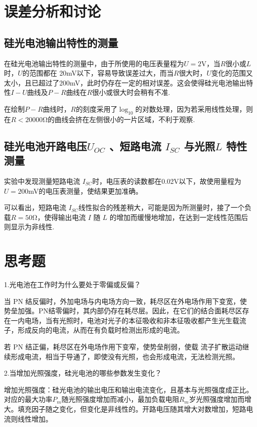 \documentclass[11pt]{article}
\begin{document}
\section{误差分析和讨论}
\subsection{硅光电池输出特性的测量}
在硅光电池输出特性的测量中，由于所使用的电压表量程为$ U=2 $V，当$ R $很小或$ L $时，$ U $的范围都在
20mV以下，容易导致误差过大，而当$ R $很大时，$ U $变化的范围又太小，且已超过了200mV，此时仍存在一定的相对误差。这会使得硅光电池输出特性$ I-U $曲线及$ P-R $曲线在$ R $很小或很大时会稍有不准.

在绘制$ P-R $曲线时，$ R $的刻度采用了$ \log_{10} $的对数处理，因为若采用线性处理，则在$ R<20000 $Ω的曲线会挤在左侧很小的一片区域，不利于观察.
\subsection{硅光电池开路电压$ U_{OC} $ 、短路电流 $ I_{SC}  $ 与光照$  L $ 特性测量}
实验中发现测量短路电流 $ I_{SC}  $时，电压表的读数都在0.02V以下，故使用量程为$ U=200 $mV的电压表测量，使结果更加准确。

可以看出，短路电流 $ I_{SC}  $线性拟合的残差稍大，可能是因为所测量时，接了一个负载$ R=50 $Ω，使得输出电流 $ I $ 随 $ L $ 的增加而缓慢地增加，在达到一定线性范围后则显示为非线性.
\section{思考题}
\kaishu 1.光电池在工作时为什么要处于零偏或反偏？

\songti 当 PN 结反偏时，外加电场与内电场方向一致，耗尽区在外电场作用下变宽，使势垒加强。PN结零偏时，其内部仍存在耗尽层。因此，在它们的结合面耗尽区存在一内电场，当有光照时，电池对光子的本征吸收和非本征吸收都产生光生载流子，形成反向的电流，从而在有负载时检测出形成的电流。

若 PN 结正偏，耗尽区在外电场作用下变窄，使势垒削弱，使载
流子扩散运动继续形成电流，相当于导通了，即使没有光照，也会形成电流，无法检测光照。

\kaishu 2.当增加光照强度，硅光电池的哪些参数发生变化？

\songti 增加光照强度：硅光电池的输出电压和输出电流变化，且基本与光照强度成正比。对应的最大功率$ P_m $随光照强度增加而减小，最加负载电阻$ R_m $岁光照强度增加而增大。填充因子随之变化，但变化是非线性的。开路电压随其增大对数增加，短路电流则线性增加。
\end{document}
